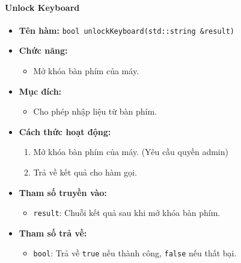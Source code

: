 \paragraph{Unlock Keyboard}
\begin{itemize}
    \item \textbf{Tên hàm:} \texttt{bool unlockKeyboard(std::string \&result)}
    \item \textbf{Chức năng:}
    \begin{itemize}
        \item Mở khóa bàn phím của máy.
    \end{itemize}
    \item \textbf{Mục đích:}
    \begin{itemize}
        \item Cho phép nhập liệu từ bàn phím.
    \end{itemize}
    \item \textbf{Cách thức hoạt động:}
    \begin{enumerate}
        \item Mở khóa bàn phím của máy. (Yêu cầu quyền admin)
        \item Trả về kết quả cho hàm gọi.
    \end{enumerate}
    \item \textbf{Tham số truyền vào:}
    \begin{itemize}
        \item \texttt{result}: Chuỗi kết quả sau khi mở khóa bàn phím.
    \end{itemize}
    \item \textbf{Tham số trả về:}
    \begin{itemize}
        \item \texttt{bool}: Trả về \texttt{true} nếu thành công, \texttt{false} nếu thất bại.
    \end{itemize}
\end{itemize}

